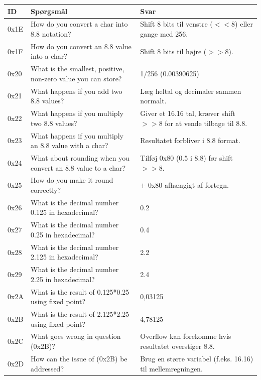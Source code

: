 \keepXColumns
\begin{tabularx}{\textwidth}{|l|X|X|}
\hline
\textbf{ID} & \textbf{Spørgsmål} & \textbf{Svar} \\ \hline
\endhead
0x1E & How do you convert a char into 8.8 notation? & Shift 8 bits til venstre ($<< 8$) eller gange med 256. \\ \hline
0x1F & How do you convert an 8.8 value into a char? & Shift 8 bits til højre ($>> 8$). \\ \hline
0x20 & What is the smallest, positive, non-zero value you can store? & 1/256 (0.00390625) \\ \hline
0x21 & What happens if you add two 8.8 values? & Læg heltal og decimaler sammen normalt. \\ \hline
0x22 & What happens if you multiply two 8.8 values? & Giver et 16.16 tal, kræver shift $>> 8$ for at vende tilbage til 8.8. \\ \hline
0x23 & What happens if you multiply an 8.8 value with a char? & Resultatet forbliver i 8.8 format. \\ \hline
0x24 & What about rounding when you convert an 8.8 value to a char? & Tilføj 0x80 ($0.5$ i 8.8) før shift $>> 8$. \\ \hline
0x25 & How do you make it round correctly? & $\pm$ 0x80 afhængigt af fortegn. \\ \hline
0x26 & What is the decimal number 0.125 in hexadecimal? & 0.2 \\ \hline
0x27 & What is the decimal number 0.25 in hexadecimal? & 0.4 \\ \hline
0x28 & What is the decimal number 2.125 in hexadecimal? & 2.2 \\ \hline
0x29 & What is the decimal number 2.25 in hexadecimal? & 2.4 \\ \hline
0x2A & What is the result of 0.125*0.25 using fixed point? & 0,03125 \\ \hline
0x2B & What is the result of 2.125*2.25 using fixed point? & 4,78125 \\ \hline
0x2C & What goes wrong in question (0x2B)? & Overflow kan forekomme hvis resultatet overstiger 8.8. \\ \hline
0x2D & How can the issue of (0x2B) be addressed? & Brug en større variabel (f.eks. 16.16) til mellemregningen. \\ \hline
\end{tabularx}
